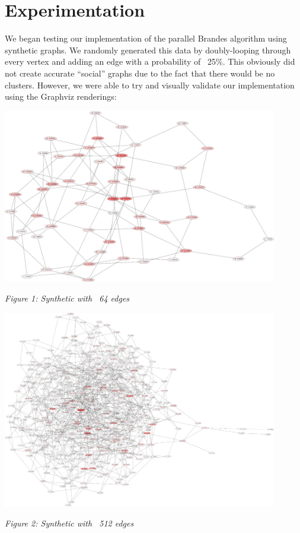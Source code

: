 \documentclass[11pt,a4paper,titlepage]{article}
\begin{document}
\section{Experimentation} %
\label{sec:methods}

We began testing our implementation of the parallel Brandes algorithm using
synthetic graphs. We randomly generated this data by doubly-looping through
every vertex and adding an edge with a probability of ~25\%. This obviously did
not create accurate ``social'' graphs due to the fact that there would be no
clusters. However, we were able to try and visually validate our implementation
using the Graphviz renderings:

\begin{center}
\includegraphics[width=0.9\textwidth]{figures/synthetic64_2}
\end{center}
\begin{center}
\textit{Figure 1: Synthetic with ~64 edges}
\end{center}

\begin{center}
\includegraphics[width=0.9\textwidth]{figures/synthetic512_1}
\end{center}
\begin{center}
\textit{Figure 2: Synthetic with ~512 edges}
\end{center}
\end{document}
